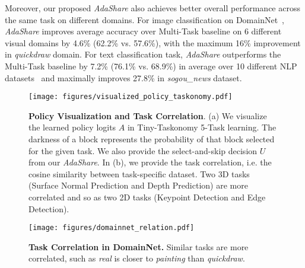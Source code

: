 Moreover, our proposed \textit{AdaShare} also achieves better overall performance across the same task on different domains. For image classification on DomainNet~\cite{peng2019moment}, \textit{AdaShare} improves average accuracy over Multi-Task baseline on 6 different visual domains by 4.6\% (62.2\% vs. 57.6\%), with the maximum 16\% improvement in \textit{quickdraw} domain. For text classification task, \textit{AdaShare} outperforms the Multi-Task baseline by 7.2\% (76.1\% vs. 68.9\%) in average over 10 different NLP datasets~\cite{chen2018exploring} and maximally improves 27.8\% in \textit{sogou\_news} dataset. 

\begin{figure*}
\begin{center}
     \texttt{[image: figures/visualized\_policy\_taskonomy.pdf]}
\end{center}
\vspace{-5pt}
   \caption{\small \textbf{Policy Visualization and Task Correlation}. (a) We visualize the learned policy logits $A$ in Tiny-Taskonomy 5-Task learning. The darkness of a block represents the probability of that block selected for the given task. We also provide the select-and-skip decision $U$ from our \textit{AdaShare}. In (b), we provide the task correlation, i.e. the cosine similarity between task-specific dataset. Two 3D tasks (Surface Normal Prediction and Depth Prediction) are more correlated and so as two 2D tasks (Keypoint Detection and Edge Detection).}
   \label{fig:policy_visualization}
\vspace{-12pt}
\end{figure*}

\begin{wrapfigure}{r}{0.3\textwidth}
  \begin{center}
    \texttt{[image: figures/domainnet\_relation.pdf]}
  \end{center}
  \caption{\small \textbf{Task Correlation in DomainNet.} Similar tasks are more correlated, such as \textit{real} is closer to \textit{painting} than \textit{quickdraw}.}\label{fig:relation_domainnet}
\end{wrapfigure}

